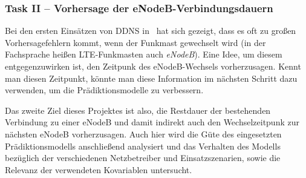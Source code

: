 \subsubsection{Task II -- Vorhersage der eNodeB-Verbindungsdauern}

Bei den ersten Eins\"atzen von DDNS in~\cite{IEEE} hat sich gezeigt, dass es oft zu gro{\ss}en Vorhersagefehlern kommt, wenn der
Funkmast gewechselt wird (in der Fachsprache hei{\ss}en LTE-Funkmasten auch \textit{eNodeB}).
Eine Idee, um diesem entgegenzuwirken ist, den Zeitpunk des eNodeB-Wechsels vorherzusagen. Kennt man diesen Zeitpunkt, k\"onnte man
diese Information im n\"achsten Schritt dazu verwenden, um die Pr\"adiktionsmodelle zu verbessern.

Das zweite Ziel dieses Projektes ist also, die Restdauer der bestehenden Verbindung zu einer eNodeB und damit indirekt auch den
Wechselzeitpunk zur n\"achsten eNodeB vorherzusagen.
Auch hier wird die G\"ute des eingesetzten Pr\"adiktionsmodells anschlie{\ss}end analysiert und das Verhalten des Modells bez\"uglich
der verschiedenen Netzbetreiber und Einsatzszenarien, sowie die Relevanz der verwendeten Kovariablen untersucht.
